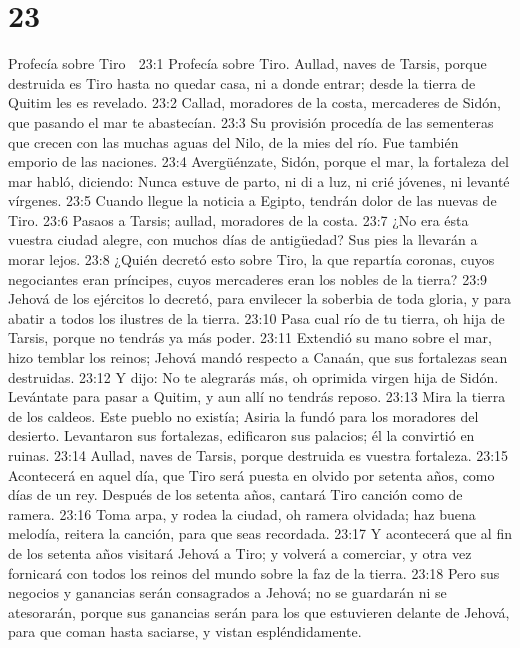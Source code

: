 \chapter{23}

Profecía sobre Tiro  

23:1 Profecía sobre Tiro. Aullad, naves de Tarsis, porque destruida es Tiro hasta no quedar casa, ni a donde entrar; desde la tierra de Quitim les es revelado.  
23:2 Callad, moradores de la costa, mercaderes de Sidón, que pasando el mar te abastecían.  
23:3 Su provisión procedía de las sementeras que crecen con las muchas aguas del Nilo, de la mies del río. Fue también emporio de las naciones.  
23:4 Avergüénzate, Sidón, porque el mar, la fortaleza del mar habló, diciendo: Nunca estuve de parto, ni di a luz, ni crié jóvenes, ni levanté vírgenes.  
23:5 Cuando llegue la noticia a Egipto, tendrán dolor de las nuevas de Tiro.  
23:6 Pasaos a Tarsis; aullad, moradores de la costa.  
23:7 ¿No era ésta vuestra ciudad alegre, con muchos días de antigüedad? Sus pies la llevarán a morar lejos.  
23:8 ¿Quién decretó esto sobre Tiro, la que repartía coronas, cuyos negociantes eran príncipes, cuyos mercaderes eran los nobles de la tierra?  
23:9 Jehová de los ejércitos lo decretó, para envilecer la soberbia de toda gloria, y para abatir a todos los ilustres de la tierra.  
23:10 Pasa cual río de tu tierra, oh hija de Tarsis, porque no tendrás ya más poder.  
23:11 Extendió su mano sobre el mar, hizo temblar los reinos; Jehová mandó respecto a Canaán, que sus fortalezas sean destruidas.  
23:12 Y dijo: No te alegrarás más, oh oprimida virgen hija de Sidón. Levántate para pasar a Quitim, y aun allí no tendrás reposo.  
23:13 Mira la tierra de los caldeos. Este pueblo no existía; Asiria la fundó para los moradores del desierto. Levantaron sus fortalezas, edificaron sus palacios; él la convirtió en ruinas.  
23:14 Aullad, naves de Tarsis, porque destruida es vuestra fortaleza.  
23:15 Acontecerá en aquel día, que Tiro será puesta en olvido por setenta años, como días de un rey. Después de los setenta años, cantará Tiro canción como de ramera.  
23:16 Toma arpa, y rodea la ciudad, oh ramera olvidada; haz buena melodía, reitera la canción, para que seas recordada.  
23:17 Y acontecerá que al fin de los setenta años visitará Jehová a Tiro; y volverá a comerciar, y otra vez fornicará con todos los reinos del mundo sobre la faz de la tierra.  
23:18 Pero sus negocios y ganancias serán consagrados a Jehová; no se guardarán ni se atesorarán, porque sus ganancias serán para los que estuvieren delante de Jehová, para que coman hasta saciarse, y vistan espléndidamente. 

